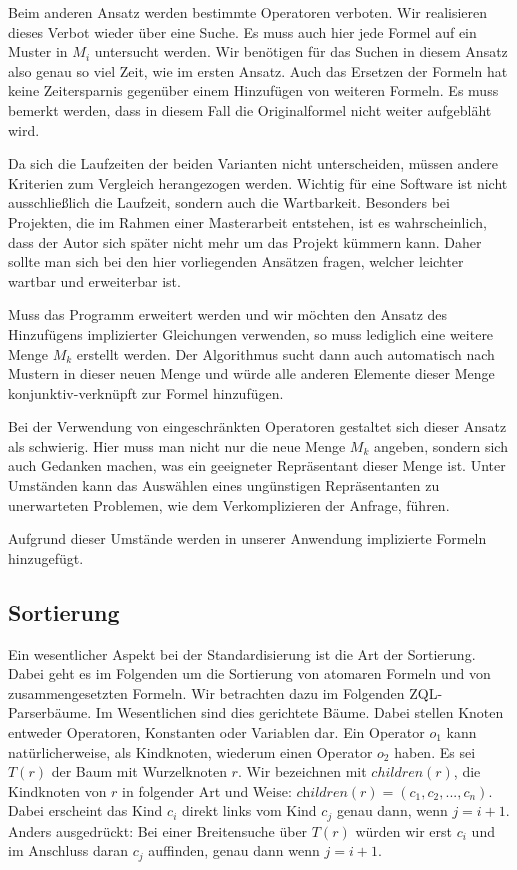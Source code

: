 Beim anderen Ansatz werden bestimmte Operatoren verboten. Wir realisieren dieses Verbot wieder über eine Suche. Es muss auch hier jede Formel auf ein Muster in $M_i$ untersucht werden. Wir benötigen für das Suchen in diesem Ansatz also genau so viel Zeit, wie im ersten Ansatz. Auch das Ersetzen der Formeln hat keine Zeitersparnis gegenüber einem Hinzufügen von weiteren Formeln. Es muss bemerkt werden, dass in diesem Fall die Originalformel nicht weiter aufgebläht wird.

Da sich die Laufzeiten der beiden Varianten nicht unterscheiden, müssen andere Kriterien zum Vergleich herangezogen werden. Wichtig für eine Software ist nicht ausschließlich die Laufzeit, sondern auch die Wartbarkeit. Besonders bei Projekten, die im Rahmen einer Masterarbeit entstehen, ist es wahrscheinlich, dass der Autor sich später nicht mehr um das Projekt kümmern kann. Daher sollte man sich bei den hier vorliegenden Ansätzen fragen, welcher leichter wartbar und erweiterbar ist.

Muss das Programm erweitert werden und wir möchten den Ansatz des Hinzufügens implizierter Gleichungen verwenden, so muss lediglich eine weitere Menge $M_k$ erstellt werden. Der Algorithmus sucht dann auch automatisch nach Mustern in dieser neuen Menge und würde alle anderen Elemente dieser Menge konjunktiv-verknüpft zur Formel hinzufügen. 

Bei der Verwendung von eingeschränkten Operatoren gestaltet sich dieser Ansatz als schwierig. Hier muss man nicht nur die neue Menge $M_k$ angeben, sondern sich auch Gedanken machen, was ein geeigneter Repräsentant dieser Menge ist. Unter Umständen kann das Auswählen eines ungünstigen Repräsentanten zu unerwarteten Problemen, wie dem Verkomplizieren der Anfrage, führen.

Aufgrund dieser Umstände werden in unserer Anwendung implizierte Formeln hinzugefügt.

\subsection{Sortierung}
\label{subsec:sort}

Ein wesentlicher Aspekt bei der Standardisierung ist die Art der Sortierung. Dabei geht es im Folgenden um die Sortierung von atomaren Formeln und von zusammengesetzten Formeln. Wir betrachten dazu im Folgenden ZQL-Parserbäume. Im Wesentlichen sind dies gerichtete Bäume. Dabei stellen Knoten entweder Operatoren, Konstanten oder Variablen dar. Ein Operator $o_1$ kann natürlicherweise, als Kindknoten, wiederum einen Operator $o_2$ haben. Es sei $T(r)$ der Baum mit Wurzelknoten $r$. Wir bezeichnen mit $\mathit{children}(r)$, die Kindknoten von $r$ in folgender Art und Weise: $\textit{children}(r) = (c_1, c_2, ..., c_n)$. Dabei erscheint das Kind $c_i$ direkt links vom Kind $c_j$ genau dann, wenn $j = i + 1$. Anders ausgedrückt: Bei einer Breitensuche über $T(r)$ würden wir erst $c_i$ und im Anschluss daran $c_j$ auffinden, genau dann wenn $j = i + 1$.

